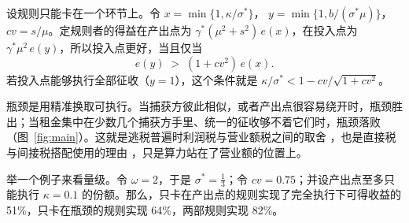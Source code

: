 \begin{corollary}[只能卡在一处]\label{cor:one}
设规则只能卡在一个环节上。令 $x=\min\{1,\kappa/\sigma^*\}$，
$y=\min\{1,b/(\sigma^*\mu)\}$，\allowbreak $cv=s/\mu$。定规则者的得益在产出点为
$\gamma^*(\mu^2+s^2)\,e(x)$，在投入点为 $\gamma^*\mu^2\,e(y)$，所以投入点更好，当且仅当
\begin{equation}
  e(y)\;>\;(1+cv^2)\,e(x).
\end{equation}
若投入点能够执行全部征收（\allowbreak $y=1$），这个条件就是
$\kappa/\sigma^*<1-cv/\sqrt{1+cv^2}$。
\end{corollary}

瓶颈是用精准换取可执行。当捕获方彼此相似，或者产出点很容易绕开时，瓶颈胜出；当租金集中在少数几个捕获方手里、统一的征收够不着它们时，瓶颈落败（图~\ref{fig:main}）。这就是逃税普遍时利润税与营业额税之间的取舍 \citep{BestEtAl2015}，也是直接税与间接税搭配使用的理由
\citep{BoadwayMarchandPestieau1994}，只是算力站在了营业额的位置上。

举一个例子来看量级。令 $\omega=2$，于是 $\sigma^*=\frac13$；令 $cv=0.75$；并设产出点至多只能执行 $\kappa=0.1$ 的份额。那么，只卡在产出点的规则实现了完全执行下可得收益的 51\%，只卡在瓶颈的规则实现 64\%，两部规则实现 82\%。

